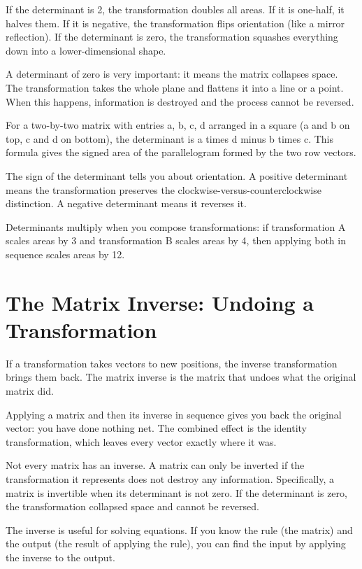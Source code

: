 \documentclass[11pt]{article}
\begin{document}
If the determinant is 2, the transformation doubles all areas. If it is one-half, it halves them. If it is negative, the transformation flips orientation (like a mirror reflection). If the determinant is zero, the transformation squashes everything down into a lower-dimensional shape.

A determinant of zero is very important: it means the matrix collapses space. The transformation takes the whole plane and flattens it into a line or a point. When this happens, information is destroyed and the process cannot be reversed.

For a two-by-two matrix with entries a, b, c, d arranged in a square (a and b on top, c and d on bottom), the determinant is a times d minus b times c. This formula gives the signed area of the parallelogram formed by the two row vectors.

The sign of the determinant tells you about orientation. A positive determinant means the transformation preserves the clockwise-versus-counterclockwise distinction. A negative determinant means it reverses it.

Determinants multiply when you compose transformations: if transformation A scales areas by 3 and transformation B scales areas by 4, then applying both in sequence scales areas by 12.

\section*{The Matrix Inverse: Undoing a Transformation}

If a transformation takes vectors to new positions, the inverse transformation brings them back. The matrix inverse is the matrix that undoes what the original matrix did.

Applying a matrix and then its inverse in sequence gives you back the original vector: you have done nothing net. The combined effect is the identity transformation, which leaves every vector exactly where it was.

Not every matrix has an inverse. A matrix can only be inverted if the transformation it represents does not destroy any information. Specifically, a matrix is invertible when its determinant is not zero. If the determinant is zero, the transformation collapsed space and cannot be reversed.

The inverse is useful for solving equations. If you know the rule (the matrix) and the output (the result of applying the rule), you can find the input by applying the inverse to the output.
\end{document}
